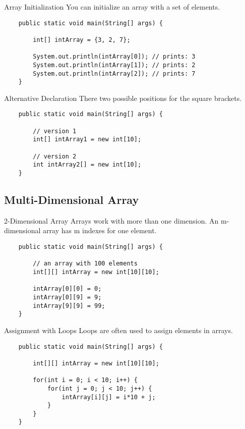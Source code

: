 \begin{frame}[fragile]{Array Initialization} %
    You can initialize an array with a set of elements.
    \begin{lstlisting}
    public static void main(String[] args) {
    
        int[] intArray = {3, 2, 7};
        
        System.out.println(intArray[0]); // prints: 3
        System.out.println(intArray[1]); // prints: 2
        System.out.println(intArray[2]); // prints: 7
    }\end{lstlisting}
\end{frame}

\begin{frame}[fragile]{Alternative Declaration}
    There two possible positions for the square brackets. 
    \begin{lstlisting}
    public static void main(String[] args) {

        // version 1    
        int[] intArray1 = new int[10];
        
        // version 2
        int intArray2[] = new int[10];
    }\end{lstlisting}
\end{frame}

\subsection{Multi-Dimensional Array}
\begin{frame}[fragile]{2-Dimensional Array}
    Arrays work with more than one dimension. 
    An m-dimensional array has m indexes for one element.
    \begin{lstlisting}
    public static void main(String[] args) {

        // an array with 100 elements
        int[][] intArray = new int[10][10];
        
        intArray[0][0] = 0;
        intArray[0][9] = 9;
        intArray[9][9] = 99;
    } \end{lstlisting}
\end{frame}

\begin{frame}[fragile]{Assignment with Loops}
    Loops are often used to assign elements in arrays.
    \begin{lstlisting}
    public static void main(String[] args) {

        int[][] intArray = new int[10][10];
        
        for(int i = 0; i < 10; i++) {
            for(int j = 0; j < 10; j++) {
                intArray[i][j] = i*10 + j;
            }
        }
    } \end{lstlisting}
\end{frame}

